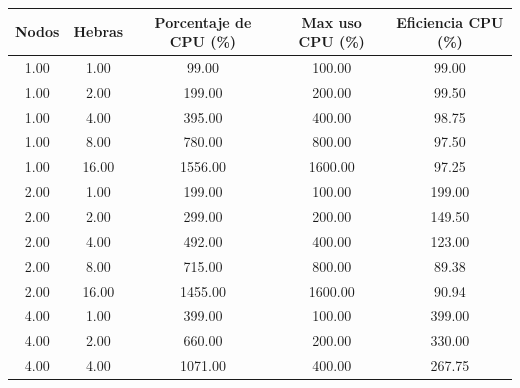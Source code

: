 \begin{table}[ht]
    \centering
    \begin{tabular}{|c|c|c|c|c|}
        \hline
        \textbf{Nodos} & \textbf{Hebras} & \textbf{Porcentaje de CPU (\%)} & \textbf{Max uso CPU (\%)} & \textbf{Eficiencia CPU (\%)} \\
        \hline
        1.00           & 1.00            & 99.00                           & 100.00                    & 99.00                        \\
        1.00           & 2.00            & 199.00                          & 200.00                    & 99.50                        \\
        1.00           & 4.00            & 395.00                          & 400.00                    & 98.75                        \\
        1.00           & 8.00            & 780.00                          & 800.00                    & 97.50                        \\
        1.00           & 16.00           & 1556.00                         & 1600.00                   & 97.25                        \\
        2.00           & 1.00            & 199.00                          & 100.00                    & 199.00                       \\
        2.00           & 2.00            & 299.00                          & 200.00                    & 149.50                       \\
        2.00           & 4.00            & 492.00                          & 400.00                    & 123.00                       \\
        2.00           & 8.00            & 715.00                          & 800.00                    & 89.38                        \\
        2.00           & 16.00           & 1455.00                         & 1600.00                   & 90.94                        \\
        4.00           & 1.00            & 399.00                          & 100.00                    & 399.00                       \\
        4.00           & 2.00            & 660.00                          & 200.00                    & 330.00                       \\
        4.00           & 4.00            & 1071.00                         & 400.00                    & 267.75                       \\

\end{tabular}
\end{table}
